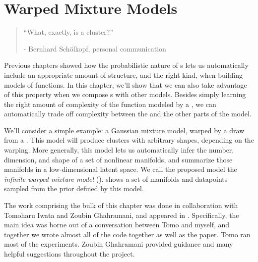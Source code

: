 
\inbpdocument

\chapter{Warped Mixture Models}  %
\label{ch:warped}

\begin{quotation}
``What, exactly, is a cluster?''

\hspace*{\fill} - Bernhard Sch\"{o}lkopf, personal communication
\end{quotation}

Previous chapters showed how the probabilistic nature of \gp{}s lets us automatically include an appropriate amount of structure, and the right kind, when building models of functions.
In this chapter, we'll show that we can also take advantage of this property when we compose \gp{}s with other models.
Besides simply learning the right amount of complexity of the function modeled by a \gp{}, we can automatically trade off complexity between the \gp{} and the other parts of the model.

We'll consider a simple example: a Gaussian mixture model, warped by a draw from a \gp{}.
This model will produce clusters with arbitrary shapes, depending on the warping.
More generally, this model lets us automatically infer the number, dimension, and shape of a set of nonlinear manifolds, and summarize those manifolds in a low-dimensional latent space.
We call the proposed model the {\it infinite warped mixture model} (\iwmm{}).
 shows a set of manifolds and datapoints sampled from the prior defined by this model.






The work comprising the bulk of this chapter was done in collaboration with Tomoharu Iwata and Zoubin Ghahramani, and appeared in \citep{IwaDuvGha12}.
Specifically, the main idea was borne out of a conversation between Tomo and myself, and together we wrote almost all of the code together as well as the paper.
Tomo ran most of the experiments.
Zoubin Ghahramani provided guidance and many helpful suggestions throughout the project.


